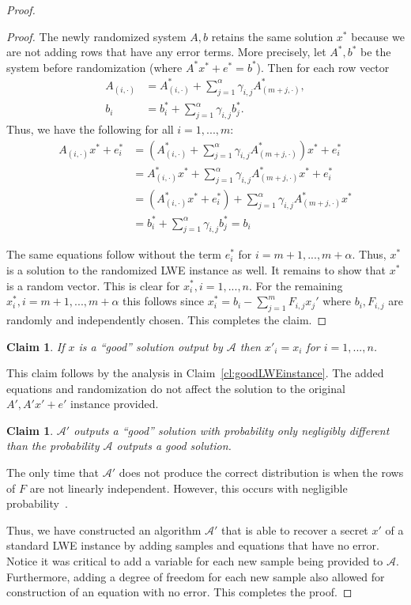\documentclass[11pt]{article}
\newcommand{\clref}[1]{\mbox{Claim~\ref{#1}}}
\newtheorem{claim}[theorem]{Claim}
\begin{document}
{\begin{proof}
\begin{proof}
The newly randomized system $A,b$ retains the same solution $x^*$  because we are not adding rows that have any error terms.  More precisely, let $A^*, b^*$ be the system before randomization (where $A^*x^*+e^* = b^*$).  Then for each row vector 
\begin{align*}
A_{(i, \cdot)} &= A^*_{(i, \cdot)}+\sum_{j=1}^\alpha \gamma_{i, j} A^*_{(m+j, \cdot)}, \\b_i &= b^*_i + \sum_{j=1}^\alpha \gamma_{i,j}b_j^*.
\end{align*}
Thus, we have the following for all $i=1,..., m$:
\begin{align*}
A_{(i, \cdot)} x^* +e_i^*&= (A^*_{(i, \cdot)}+\sum_{j=1}^\alpha \gamma_{i, j} A^*_{(m+j, \cdot)})x^*+e_i^*\\
&= A^*_{(i, \cdot)}x^* + \sum_{j=1}^\alpha \gamma_{i,j} A^*_{(m+j, \cdot)}x^*+e_i^*\\
&=\left( A^*_{(i, \cdot)}x^* + e_i^*\right)+ \sum_{j=1}^\alpha \gamma_{i,j} A^*_{(m+j, \cdot)}x^* \\
&= b^*_i + \sum_{j=1}^\alpha \gamma_{i,j}b_j^* = b_i
\end{align*}

The same equations follow without the term $e_i^*$ for $i=m+1,..., m+\alpha$.  
Thus, $x^*$ is a solution to the randomized LWE instance as well.  It remains to show that $x^*$ is a random vector.  This is clear for $x^*_i, i=1,...,n$.  For the remaining $x^*_i, i=m+1, ..., m+\alpha$ this follows since $x^*_i = b_i - \sum_{j=1}^m F_{i, j} x_j'$ where $b_i, F_{i, j}$ are randomly and independently chosen.  This completes the claim.
\end{proof}
\begin{claim}
If $x$ is a ``good'' solution output by $\mathcal{A}$ then $x'_i = x_i$ for $i=1,...,n$.  
\end{claim}
This claim follows by the analysis in \clref{cl:goodLWEinstance}.  The added equations and randomization do not affect the solution to the original $A', A'x'+e'$ instance provided.
\begin{claim}
$\mathcal{A'}$ outputs a ``good'' solution with probability only negligibly different  than the probability $\mathcal{A}$ outputs a good solution.
\end{claim}
The only time that $\mathcal{A'}$ does not produce the correct distribution is when the rows of $F$ are not linearly independent.  However, this occurs with negligible probability~\cite{something}.

Thus, we have constructed an algorithm $\mathcal{A'}$ that is able to recover a secret $x'$ of a standard LWE instance by adding samples  and equations that have no error.  Notice it was critical to add a variable for each new sample being provided to $\mathcal{A}$.  Furthermore, adding a degree of freedom for each new sample also allowed for construction of an equation with no error.  This completes the proof.


\end{proof}}
\end{document}
